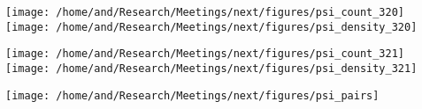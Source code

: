 \documentclass{article}
\begin{document}
\centering
\texttt{[image: /home/and/Research/Meetings/next/figures/psi\_count\_320]}
\texttt{[image: /home/and/Research/Meetings/next/figures/psi\_density\_320]}

\texttt{[image: /home/and/Research/Meetings/next/figures/psi\_count\_321]}
\texttt{[image: /home/and/Research/Meetings/next/figures/psi\_density\_321]}

\texttt{[image: /home/and/Research/Meetings/next/figures/psi\_pairs]}
\end{document}
